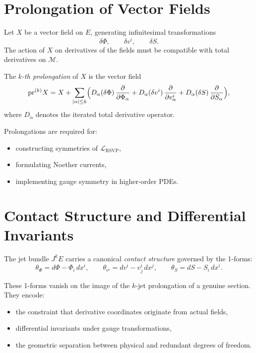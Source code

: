 \section{Prolongation of Vector Fields}

Let $X$ be a vector field on $E$, generating infinitesimal transformations
\[
\delta\Phi,\qquad \delta v^i,\qquad \delta S.
\]
The action of $X$ on derivatives of the fields must be compatible with total derivatives on $\mathcal{M}$.

\begin{definition}[k-th Prolongation]
The \emph{$k$-th prolongation} of $X$ is the vector field
\[
\mathrm{pr}^{(k)}X
=
X
+
\sum_{|\alpha|\le k}
\Bigl(
D_\alpha(\delta\Phi)\,\frac{\partial}{\partial\Phi_\alpha}
+
D_\alpha(\delta v^i)\,\frac{\partial}{\partial v^i_\alpha}
+
D_\alpha(\delta S)\,\frac{\partial}{\partial S_\alpha}
\Bigr),
\]
where $D_\alpha$ denotes the iterated total derivative operator.
\end{definition}

Prolongations are required for:
\begin{itemize}
\item constructing symmetries of $\mathcal{L}_{\mathrm{RSVP}}$,
\item formulating Noether currents,
\item implementing gauge symmetry in higher-order PDEs.
\end{itemize}

\section{Contact Structure and Differential Invariants}

The jet bundle $J^k E$ carries a canonical \emph{contact structure} governed by the 1-forms:
\[
\theta_\Phi = d\Phi - \Phi_i\,dx^i,\qquad
\theta_{v^i} = dv^i - v^i_j\,dx^j,\qquad
\theta_S = dS - S_i\,dx^i.
\]

These 1-forms vanish on the image of the $k$-jet prolongation of a genuine section.  
They encode:
\begin{itemize}
\item the constraint that derivative coordinates originate from actual fields,
\item differential invariants under gauge transformations,
\item the geometric separation between physical and redundant degrees of freedom.
\end{itemize}

